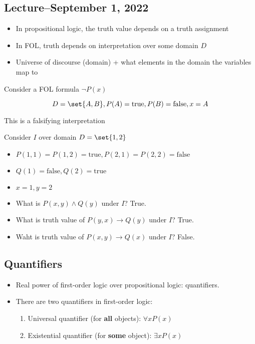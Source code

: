 \documentclass[8pt]{scrreprt}
\newcommand{\true}{\text{true}}
\newcommand{\false}{\text{false}}
\begin{document}
\begin{landscape}
\begin{multicols*}{3}
\section{Lecture--September 1, 2022}
\begin{itemize}
	\item In propositional logic, the truth value depends on a truth assignment
	\item In FOL, truth depends on interpretation over some domain $D$
	\item Universe of discourse (domain) + what elements in the domain the variables map to
\end{itemize}

\begin{example}
	Consider a FOL formula $\neg P(x)$

	\[D=\set{A, B}, P(A)=\true, P(B)=\false, x=A\]

	This is a falsifying interpretation
\end{example}

\begin{example}
	Consider $I$ over domain $D=\set{1,2}$

	\begin{itemize}
		\item $P(1, 1)=P(1,2)=\true, P(2,1)=P(2,2)=\false$
		\item $Q(1)=\false, Q(2)=\true$
		\item $x=1, y=2$
		\item What is $P(x, y)\land Q(y)$ under $I$? True.
		\item What is truth value of $P(y, x)\rightarrow Q(y)$ under $I$? True.
		\item Waht is truth value of $P(x, y)\rightarrow Q(x)$ under $I$? False.
	\end{itemize}
\end{example}

\subsection{Quantifiers}
\begin{itemize}
	\item Real power of first-order logic over propositional logic: quantifiers.
	\item There are two quantifiers in first-order logic:
	      \begin{enumerate}
		      \item Universal quantifier (for \textbf{all} objects): $\forall x P(x)$
		      \item Existential quantifier (for \textbf{some} object): $\exists x P(x)$
	      \end{enumerate}
\end{itemize}


\end{multicols*}
\end{landscape}
\end{document}
